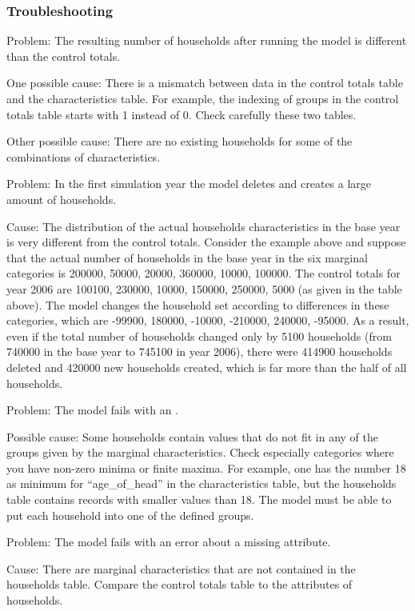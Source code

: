 \subsubsection{Troubleshooting}
%
\begin{description}
\item{Problem:} The resulting number of households after running the model is different than the control totals. 
\item{One possible cause:} 
There is a mismatch between data in the control totals table and the characteristics table. 
For example, the indexing of groups in the control totals table starts with 1 instead of 0. Check 
carefully these two tables.
\item{Other possible cause:} 
There are no existing households for some of the combinations of characteristics. 
\item{Problem:} In the first simulation year the model deletes and creates a large amount of households.
\item{Cause:} The distribution of the actual households characteristics in the base year is very different 
from the control totals. Consider the example above and suppose that the actual number of households in the base year in the 
six marginal categories is 200000, 50000, 20000, 360000, 10000, 100000. The control totals for year 2006 are 
100100, 230000, 10000, 150000, 250000, 5000  (as given in the table above). The model changes the household 
set according to differences in these categories, which are -99900,  180000,  -10000, -210000,  240000,  -95000. 
As a result, even if the total number of households changed only by 5100 households (from 740000 in the base year 
to 745100 in year 2006), there were 414900 households deleted and 420000 new households created, which is far more 
than the half of all households.
\item{Problem:} The model fails with an .
\item{Possible cause:} Some households contain values that do not fit in any of the groups given by the marginal characteristics. 
Check especially categories where you have non-zero minima or finite maxima. For example,
one has the number 18 as minimum for ``age_of_head'' in the characteristics table, but the households table contains 
records with smaller values than 18. The model must be able to put each household into one of the defined groups.
\item{Problem:} The model fails with an error about a missing attribute.
\item{Cause:} There are marginal characteristics that are not contained in the households table.
Compare the control totals table to the attributes of households.
\end{description}

